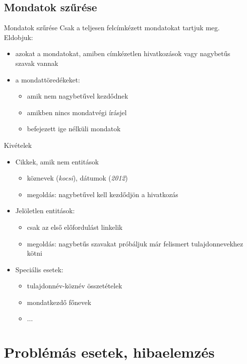 \documentclass[utf8x,t]{beamer}
\newcommand{\vitem}{\item \vspace{4pt}}
\begin{document}
\subsection{Mondatok szűrése}
\begin{frame}{Mondatok szűrése}
  \bigskip
  Csak a teljesen felcímkézett mondatokat tartjuk meg. Eldobjuk:
  \begin{itemize}
  \item azokat a mondatokat, amiben címkézetlen hivatkozások vagy nagybetűs szavak vannak
  \vitem a mondattöredékeket:
    \begin{itemize}
    \vitem amik nem nagybetűvel kezdődnek
    \vitem amikben nincs mondatvégi írásjel
    \vitem befejezett ige nélküli mondatok %
    \end{itemize}
  \end{itemize}
\end{frame}

\begin{frame}{Kivételek}
  \bigskip
  \begin{itemize}
  \vitem Cikkek, amik nem entitások
    \begin{itemize}
    \vitem köznevek (\textit{kocsi}), dátumok (\textit{2012})
    \vitem megoldás: nagybetűvel kell kezdődjön a hivatkozás
    \end{itemize}
  \vitem Jelöletlen entitások:
    \begin{itemize}
    \vitem csak az első előfordulást linkelik
    \vitem megoldás: nagybetűs szavakat próbáljuk már felismert tulajdonnevekhez kötni
    \end{itemize}
  \vitem Speciális esetek:
    \begin{itemize}
    \vitem tulajdonnév-köznév összetételek
    \vitem mondatkezdő főnevek
    \vitem ...
    \end{itemize}
  \end{itemize}
\end{frame}

\section{Problémás esetek, hibaelemzés}
\end{document}
